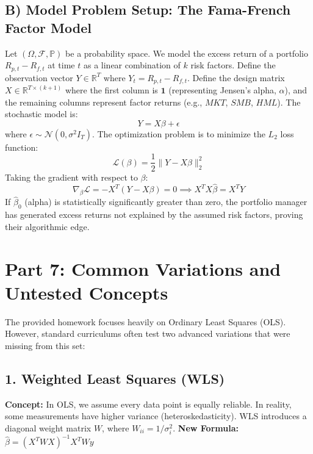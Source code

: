 \documentclass[11pt, letterpaper]{article}
\theoremstyle{definition}
\theoremstyle{remark}
\newcommand{\R}{\mathbb{R}}
\newcommand{\Prob}{\mathbb{P}}
\newcommand{\F}{\mathcal{F}}
\begin{document}
\subsection{B) Model Problem Setup: The Fama-French Factor Model}
Let $(\Omega, \F, \Prob)$ be a probability space. We model the excess return of a portfolio $R_{p,t} - R_{f,t}$ at time $t$ as a linear combination of $k$ risk factors.
Define the observation vector $Y \in \R^T$ where $Y_t = R_{p,t} - R_{f,t}$.
Define the design matrix $X \in \R^{T \times (k+1)}$ where the first column is $\mathbf{1}$ (representing Jensen's alpha, $\alpha$), and the remaining columns represent factor returns (e.g., $MKT$, $SMB$, $HML$).
The stochastic model is:
\[ Y = X\beta + \epsilon \]
where $\epsilon \sim \mathcal{N}(0, \sigma^2 I_T)$.
The optimization problem is to minimize the $L_2$ loss function:
\[ \mathcal{L}(\beta) = \frac{1}{2} \|Y - X\beta\|_2^2 \]
Taking the gradient with respect to $\beta$:
\[ \nabla_\beta \mathcal{L} = -X^T(Y - X\beta) = 0 \implies X^T X \hat{\beta} = X^T Y \]
If $\hat{\beta}_0$ (alpha) is statistically significantly greater than zero, the portfolio manager has generated excess returns not explained by the assumed risk factors, proving their algorithmic edge.

\newpage
\section{Part 7: Common Variations and Untested Concepts}

The provided homework focuses heavily on Ordinary Least Squares (OLS). However, standard curriculums often test two advanced variations that were missing from this set:

\subsection{1. Weighted Least Squares (WLS)}
\textbf{Concept:} In OLS, we assume every data point is equally reliable. In reality, some measurements have higher variance (heteroskedasticity). WLS introduces a diagonal weight matrix $W$, where $W_{ii} = 1/\sigma_i^2$. 
\textbf{New Formula:} $\hat{\beta} = (X^T W X)^{-1} X^T W y$
\end{document}
